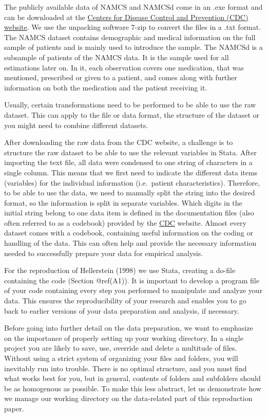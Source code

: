 \documentclass[
]{book}
\begin{document}
The publicly available data of NAMCS and NAMCSd come in an .exe format
and can be downloaded at the
\href{https://www.cdc.gov/nchs/ahcd/datasets_documentation_related.htm}{Centers
for Disease Control and Prevention (CDC) website}. We use the unpacking
software 7-zip to convert the files in a .txt format. The NAMCS dataset
contains demographic and medical information on the full sample of
patients and is mainly used to introduce the sample. The NAMCSd is a
subsample of patients of the NAMCS data. It is the sample used for all
estimations later on. In it, each observation covers one medication,
that was mentioned, prescribed or given to a patient, and comes along
with further information on both the medication and the patient
receiving it.

Usually, certain transformations need to be performed to be able to use
the raw dataset. This can apply to the file or data format, the
structure of the dataset or you might need to combine different
datasets.

After downloading the raw data from the CDC website, a challenge is to
structure the raw dataset to be able to use the relevant variables in
Stata. After importing the text file, all data were condensed to one
string of characters in a single column. This means that we first need
to indicate the different data items (variables) for the individual
information (i.e.~patient characteristics). Therefore, to be able to use
the data, we need to manually split the string into the desired format,
so the information is split in separate variables. Which digits in the
initial string belong to one data item is defined in the documentation
files (also often referred to as a codebook) provided by the
\href{https://www.cdc.gov/nchs/ahcd}{CDC} website. Almost every dataset
comes with a codebook, containing useful information on the coding or
handling of the data. This can often help and provide the necessary
information needed to successfully prepare your data for empirical
analysis.

For the reproduction of Hellerstein (1998) we use Stata, creating a
do-file containing the code (Section @ref(A1)). It is important to
develop a program file of your code containing every step you performed
to manipulate and analyze your data. This ensures the reproducibility of
your research and enables you to go back to earlier versions of your
data preparation and analysis, if necessary.

Before going into further detail on the data preparation, we want to
emphasize on the importance of properly setting up your working
directory. In a single project you are likely to save, use, override and
delete a multitude of files. Without using a strict system of organizing
your files and folders, you will inevitably run into trouble. There is
no optimal structure, and you must find what works best for you, but in
general, contents of folders and subfolders should be as homogenous as
possible. To make this less abstract, let us demonstrate how we manage
our working directory on the data-related part of this reproduction
paper.
\end{document}
